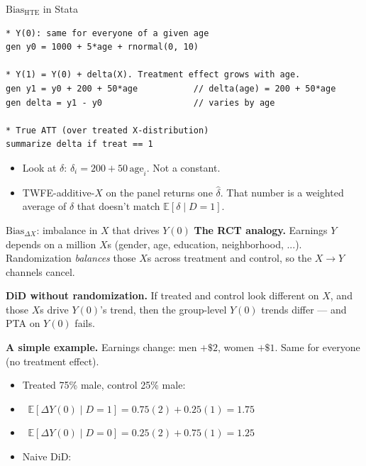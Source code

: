 \documentclass[aspectratio=169,11pt]{beamer}
\begin{document}
\begin{frame}[fragile]{$\text{Bias}_{\text{HTE}}$ in Stata}
\footnotesize
\begin{lstlisting}[language={[ANSI]C},basicstyle=\ttfamily\scriptsize]
* Y(0): same for everyone of a given age
gen y0 = 1000 + 5*age + rnormal(0, 10)

* Y(1) = Y(0) + delta(X). Treatment effect grows with age.
gen y1 = y0 + 200 + 50*age           // delta(age) = 200 + 50*age
gen delta = y1 - y0                  // varies by age

* True ATT (over treated X-distribution)
summarize delta if treat == 1
\end{lstlisting}

\vspace{0.4em}
\begin{itemize}\setlength\itemsep{2pt}
  \item Look at $\delta$: \;\;$\delta_i = 200 + 50\,\text{age}_i$. \;Not a constant.
  \item TWFE-additive-$X$ on the panel returns one $\hat{\delta}$. \;That number is a weighted average of $\delta$ that doesn't match $\mathbb{E}[\delta \mid D=1]$.
\end{itemize}
\end{frame}


\begin{frame}{$\text{Bias}_{\Delta X}$: imbalance in $X$ that drives $Y(0)$}
\footnotesize
\textbf{The RCT analogy.} \;Earnings $Y$ depends on a million $X$s (gender, age, education, neighborhood, ...). \;Randomization \textit{balances} those $X$s across treatment and control, so the $X \to Y$ channels cancel.

\vspace{0.5em}
\textbf{DiD without randomization.} \;If treated and control look different on $X$, and those $X$s drive $Y(0)$'s trend, then the group-level $Y(0)$ trends differ --- and PTA on $Y(0)$ fails.

\vspace{0.5em}
\textbf{A simple example.} \;Earnings change: \;men $+\$2$, women $+\$1$. \;Same for everyone (no treatment effect).
\begin{itemize}\setlength\itemsep{2pt}
  \item Treated 75\% male, control 25\% male:
  \item $\;\;\mathbb{E}[\Delta Y(0) \mid D{=}1] = 0.75(2) + 0.25(1) = 1.75$
  \item $\;\;\mathbb{E}[\Delta Y(0) \mid D{=}0] = 0.25(2) + 0.75(1) = 1.25$
  \item Naive DiD: \;
\end{itemize}
\end{frame}
\end{document}
